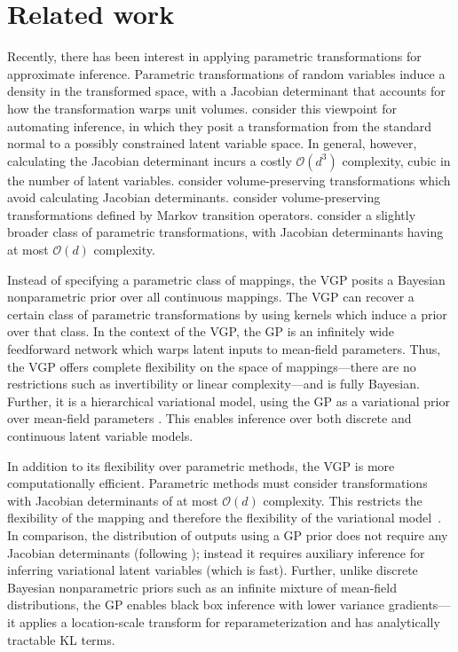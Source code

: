 
\section{Related work}
\label{sec:related}

Recently, there has been interest in applying parametric
transformations for approximate inference. Parametric transformations of
random variables induce a density in the transformed space, with a
Jacobian determinant that accounts for how the transformation warps
unit volumes. \citet{kucukelbir2016automatic} consider this viewpoint
for automating inference, in which they posit a transformation from
the standard normal to a possibly constrained latent variable space.
In general, however, calculating the Jacobian determinant incurs a
costly $\mathcal{O}(d^3)$ complexity, cubic in the number of latent
variables. \citet{dinh2015nice} consider volume-preserving
transformations which avoid calculating Jacobian determinants.
\citet{salimans2015markov} consider volume-preserving transformations
defined by Markov transition operators.
\citet{rezende2015variational} consider a slightly broader class of
parametric transformations, with Jacobian determinants having at most
$\mathcal{O}(d)$ complexity.

Instead
of specifying a parametric class of mappings, the \gls{VGP} posits a
Bayesian nonparametric prior over all continuous mappings. The
\gls{VGP} can recover a certain class of parametric transformations by
using kernels which induce a prior over that class.
In the context of the \gls{VGP}, the
\gls{GP} is an infinitely wide feedforward network which warps latent
inputs to mean-field parameters. Thus, the \gls{VGP} offers complete
flexibility on the space of mappings---there are no
restrictions such as invertibility or linear complexity---and is fully
Bayesian.
Further, it is a hierarchical variational model, using the \gls{GP} as
a variational prior over mean-field parameters
\citep{ranganath2015hierarchical}. This enables inference over both
discrete and continuous latent variable models.

In addition to its flexibility over parametric methods,
the \gls{VGP} is more computationally efficient. Parametric methods must consider transformations with
Jacobian determinants of at most $\mathcal{O}(d)$ complexity. This
restricts the flexibility of the mapping and therefore the flexibility
of the variational model~\citep{rezende2015variational}. In comparison, the distribution of outputs
using a \gls{GP} prior does not require any Jacobian determinants
(following ); instead it requires auxiliary
inference for inferring variational latent variables (which is fast). Further, unlike discrete Bayesian
nonparametric priors such as an infinite mixture of mean-field
distributions, the \gls{GP} enables black box inference with
lower variance gradients---it applies a location-scale transform for
reparameterization and has analytically tractable KL terms.

